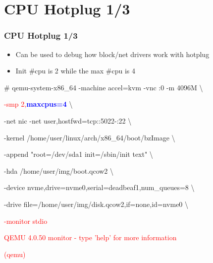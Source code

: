 \documentclass[aspectratio=169]{beamer}
\begin{document}
\section{CPU Hotplug 1/3}
\begin{frame}
\frametitle{CPU Hotplug 1/3}
\begin{itemize}
\item Can be used to debug how block/net drivers work with hotplug
\item Init \#cpu is 2 while the max \#cpu is 4
\end{itemize}
\begin{block}{}

\# qemu-system-x86\_64 -machine accel=kvm -vnc :0 -m 4096M \textbackslash

\textcolor{red}{-smp 2,\textbf{\textcolor{blue}{maxcpus=4}}} \textbackslash

-net nic -net user,hostfwd=tcp::5022-:22 \textbackslash

-kernel /home/user/linux/arch/x86\_64/boot/bzImage \textbackslash
	
-append "root=/dev/sda1 init=/sbin/init text" \textbackslash

-hda /home/user/img/boot.qcow2 \textbackslash

-device nvme,drive=nvme0,serial=deadbeaf1,num\_queues=8 \textbackslash

-drive file=/home/user/img/disk.qcow2,if=none,id=nvme0 \textbackslash

\textcolor{red}{-monitor stdio}

\textcolor{red}{QEMU 4.0.50 monitor - type 'help' for more information}

\textcolor{red}{(qemu)}
\end{block}
\end{frame}

\end{document}
